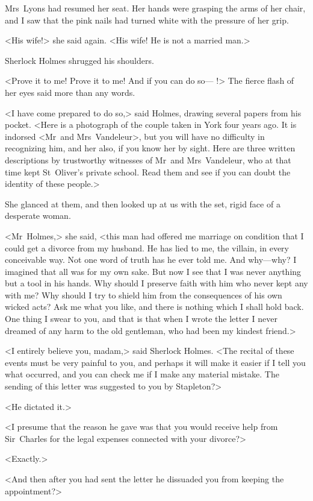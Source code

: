Mrs~Lyons had resumed her seat. Her hands were grasping the arms of her chair, and I saw that the pink nails had turned white with the pressure of her grip.

<His wife!> she said again. <His wife! He is not a married man.>

Sherlock Holmes shrugged his shoulders.

<Prove it to me! Prove it to me! And if you can do so— !> The fierce flash of her eyes said more than any words.

<I have come prepared to do so,> said Holmes, drawing several papers from his pocket. <Here is a photograph of the couple taken in York four years ago. It is indorsed <Mr~and Mrs~Vandeleur>, but you will have no difficulty in recognizing him, and her also, if you know her by sight. Here are three written descriptions by trustworthy witnesses of Mr~and Mrs~Vandeleur, who at that time kept St~Oliver's private school. Read them and see if you can doubt the identity of these people.>

She glanced at them, and then looked up at us with the set, rigid face of a desperate woman.

<Mr~Holmes,> she said, <this man had offered me marriage on condition that I could get a divorce from my husband. He has lied to me, the villain, in every conceivable way. Not one word of truth has he ever told me. And why—why? I imagined that all was for my own sake. But now I see that I was never anything but a tool in his hands. Why should I preserve faith with him who never kept any with me? Why should I try to shield him from the consequences of his own wicked acts? Ask me what you like, and there is nothing which I shall hold back. One thing I swear to you, and that is that when I wrote the letter I never dreamed of any harm to the old gentleman, who had been my kindest friend.>

<I entirely believe you, madam,> said Sherlock Holmes. <The recital of these events must be very painful to you, and perhaps it will make it easier if I tell you what occurred, and you can check me if I make any material mistake. The sending of this letter was suggested to you by Stapleton?>

<He dictated it.>

<I presume that the reason he gave was that you would receive help from Sir~Charles for the legal expenses connected with your divorce?>

<Exactly.>

<And then after you had sent the letter he dissuaded you from keeping the appointment?>

